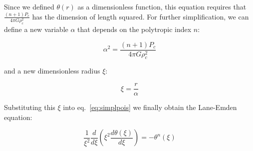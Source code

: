 \documentclass[twoside]{article}
\begin{document}
            Since we defined \(\theta(r)\) as a dimensionless function, this
            equation requires that \(\frac{(n+1)P_c}{4\pi G\rho_c^2}\) has the
            dimension of length squared. For further simplification, we can
            define a new variable \(\alpha\) that depends on the polytropic
            index \(n\):

            \begin{equation}
                \label{eq:alpha}
                \alpha^2=\frac{(n+1)P_c}{4\pi G\rho_c^2}
            \end{equation}

            and a new dimensionless radius \(\xi\):

            \begin{equation}
                \label{eq:xi}
                \xi=\frac{r}{\alpha}
            \end{equation}

            Substituting this \(\xi\) into eq.~\ref{eq:simplpois} we finally
            obtain the Lane-Emden equation:

            \begin{equation}
                \frac{1}{\xi^2}\frac{d}{d\xi}\left(\xi^2\frac{d\theta(\xi)}{d\xi}\right)=-\theta^n(\xi)
            \end{equation}
\end{document}
